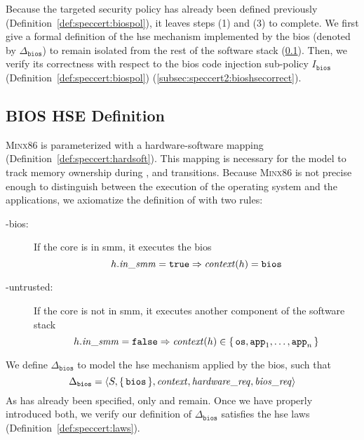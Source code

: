 Because the targeted security policy has already been defined previously
(Definition~\ref{def:speccert:biospol}), it leaves steps (1) and (3) to
complete.
%
We first give a formal definition of the \ac{hse} mechanism implemented by the
\ac{bios} (denoted by \( \Delta_{\mathtt{bios}} \)) to remain isolated from the
rest of the software stack (\ref{subsec:speccert2:bioshsedef}).
%
Then, we verify its correctness with respect to the \ac{bios} code injection
sub-policy \( I_{\mathtt{bios}} \) (Definition~\ref{def:speccert:biospol})
(\ref{subsec:speccert2:bioshsecorrect}).

\subsection{BIOS HSE Definition}
\label{subsec:speccert2:bioshsedef}

{\scshape Minx86} is parameterized with a hardware-software mapping
 (Definition~\ref{def:speccert:hardsoft}).
%
This mapping is necessary for the model to track memory ownership during
,  and  transitions.
%
Because {\scshape Minx86} is not precise enough to distinguish between the
execution of the operating system and the applications, we axiomatize the
definition of  with two rules:
%
\begin{description}
\item [-bios:] If the core is in \ac{smm}, it executes the
  \ac{bios}
  \[
    h.\mathit{in\_smm} = \mathtt{true} \Rightarrow \mathit{context}(h) = \mathtt{bios}
  \]
\item [-untrusted:] If the core is not in \ac{smm}, it executes
  another component of the software stack
  \[
    h.\mathit{in\_smm} = \mathtt{false} \Rightarrow \mathit{context}(h) \in
    \{\,\mathtt{os}, \mathtt{app}_1, \dots, \mathtt{app}_n\,\}
  \]
\end{description}


We define $\Delta_{\mathtt{bios}}$ to model the \ac{hse} mechanism applied by
the \ac{bios}, such that
\[
  \Delta_{\mathtt{bios}} = \langle S, \{\,\mathtt{bios}\,\},
  \mathit{context}, \mathit{hardware\_req}, \mathit{bios\_req} \rangle
\]
%
As  has already been specified, only  and
 remain.
%
Once we have properly introduced both, we verify our definition of
\( \Delta_{\mathtt{bios}} \) satisfies the \ac{hse} laws
(Definition~\ref{def:speccert:laws}).

